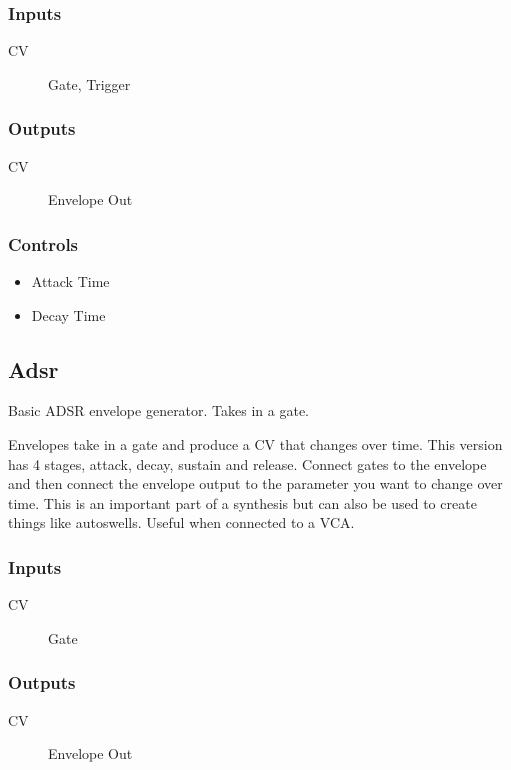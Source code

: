 \subsubsection{Inputs}
\begin{description}
\item [CV] Gate, Trigger
\end{description}

\subsubsection{Outputs}
\begin{description}
\item [CV] Envelope Out
\end{description}

\subsubsection{Controls}
\begin{itemize}
\item Attack Time
\item Decay Time
\end{itemize}

\subsection{Adsr}

Basic ADSR envelope generator. Takes in a gate.

Envelopes take in a gate and produce a CV that changes over time.
                  This version has 4 stages, attack, decay, sustain and release. Connect gates to the envelope and then connect the envelope output to the parameter you want to change over time.
                  This is an important part of a synthesis but can also be used to create things like autoswells. Useful when connected to a VCA.

\subsubsection{Inputs}
\begin{description}
\item [CV] Gate
\end{description}

\subsubsection{Outputs}
\begin{description}
\item [CV] Envelope Out
\end{description}


